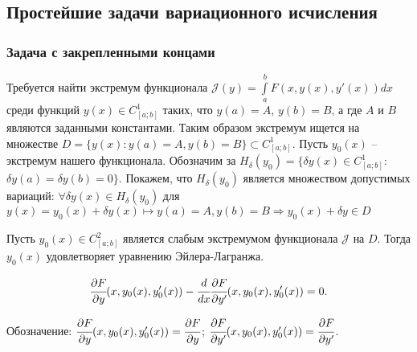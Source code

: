     \subsection{Простейшие задачи вариационного исчисления}
    \subsubsection{Задача с закрепленными концами}
    
    Требуется найти экстремум функционала $\mathcal{J} (y) = \int \limits^b_a F(x, y(x), y'(x)) dx$ среди функций $y(x) \in C^1_{[a;b]}$ таких, что $y(a) = A$, $y(b) = B$, а где $A$ и $B$ являются заданными константами.
    Таким образом экстремум ищется на множестве $D = \{y(x): y(a) = A, y(b) = B\} \subset C^1_{[a;b]}$. Пусть $y_0(x)$ -- экстремум нашего функционала.  
    Обозначим за $H_{\delta}(y_0) = \{ \delta y(x) \in C^1_{[a;b]}$: $\delta y(a) = \delta y(b) = 0 \}$.
    Покажем, что $H_{\delta}(y_0)$ является множеством допустимых вариаций: $\forall \delta y(x) \in H_{\delta}(y_0)$ для $y(x) = y_0(x) + \delta y(x) \mapsto y(a) = A, y(b) = B \Rightarrow y_0(x) + \delta y \in D$
    
    \begin{theorem}
    	Пусть $y_0(x) \in C^2_{[a;b]}$ является слабым экстремумом функционала $\mathcal{J}$ на $D$. Тогда $y_0(x)$ удовлетворяет уравнению Эйлера-Лагранжа.
    	
    	\begin{equation} \label{issue15:IF}
    		\cfrac{\partial F}{\partial y}(x, y_0(x), y'_0(x)) - \cfrac{d}{dx} \cfrac{\partial F}{\partial y'} (x, y_0(x), y'_0(x)) = 0.
    	\end{equation}
    	
    	Обозначение: $\cfrac{\partial F}{\partial y}(x, y_0(x), y'_0(x)) = \cfrac{\partial F}{\partial y}$; $\cfrac{\partial F}{\partial y'} (x, y_0(x), y'_0(x)) = \cfrac{\partial F}{\partial y'}$.
    	
    \end{theorem}
    
